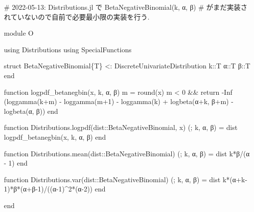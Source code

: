 \documentclass[
  letterpaper,
  DIV=11,
  numbers=noendperiod]{scrartcl}
\newenvironment{Shaded}{\begin{snugshade}}{\end{snugshade}}
\newcommand{\BuiltInTok}[1]{\textcolor[rgb]{0.00,0.23,0.31}{#1}}
\newcommand{\CommentTok}[1]{\textcolor[rgb]{0.37,0.37,0.37}{#1}}
\newcommand{\ConstantTok}[1]{\textcolor[rgb]{0.56,0.35,0.01}{#1}}
\newcommand{\ControlFlowTok}[1]{\textcolor[rgb]{0.00,0.23,0.31}{#1}}
\newcommand{\DataTypeTok}[1]{\textcolor[rgb]{0.68,0.00,0.00}{#1}}
\newcommand{\FloatTok}[1]{\textcolor[rgb]{0.68,0.00,0.00}{#1}}
\newcommand{\FunctionTok}[1]{\textcolor[rgb]{0.28,0.35,0.67}{#1}}
\newcommand{\ImportTok}[1]{\textcolor[rgb]{0.00,0.46,0.62}{#1}}
\newcommand{\KeywordTok}[1]{\textcolor[rgb]{0.00,0.23,0.31}{#1}}
\newcommand{\NormalTok}[1]{\textcolor[rgb]{0.00,0.23,0.31}{#1}}
\newcommand{\OperatorTok}[1]{\textcolor[rgb]{0.37,0.37,0.37}{#1}}
\begin{document}
\begin{Shaded}
\begin{Highlighting}[]
\CommentTok{\# 2022{-}05{-}13: Distributions.jl で BetaNegativeBinomial(k, α, β)}
\CommentTok{\# がまだ実装されていないので自前で必要最小限の実装を行う.}

\KeywordTok{module}\NormalTok{ O}

\ImportTok{using} \BuiltInTok{Distributions}
\ImportTok{using} \BuiltInTok{SpecialFunctions}

\KeywordTok{struct}\NormalTok{ BetaNegativeBinomial\{T\} }\OperatorTok{\textless{}:}\DataTypeTok{ DiscreteUnivariateDistribution}
\NormalTok{    k}\OperatorTok{::}\DataTypeTok{T}
\NormalTok{    α}\OperatorTok{::}\DataTypeTok{T}
\NormalTok{    β}\OperatorTok{::}\DataTypeTok{T}
\KeywordTok{end}

\KeywordTok{function} \FunctionTok{logpdf\_betanegbin}\NormalTok{(x, k, α, β)}
\NormalTok{    m }\OperatorTok{=} \FunctionTok{round}\NormalTok{(x)}
\NormalTok{    m }\OperatorTok{\textless{}} \FloatTok{0} \OperatorTok{\&\&} \ControlFlowTok{return} \OperatorTok{{-}}\ConstantTok{Inf}
\NormalTok{    (}\FunctionTok{loggamma}\NormalTok{(k}\OperatorTok{+}\NormalTok{m) }\OperatorTok{{-}} \FunctionTok{loggamma}\NormalTok{(m}\OperatorTok{+}\FloatTok{1}\NormalTok{) }\OperatorTok{{-}} \FunctionTok{loggamma}\NormalTok{(k) }\OperatorTok{+} \FunctionTok{logbeta}\NormalTok{(α}\OperatorTok{+}\NormalTok{k, β}\OperatorTok{+}\NormalTok{m) }\OperatorTok{{-}} \FunctionTok{logbeta}\NormalTok{(α, β))}
\KeywordTok{end}

\KeywordTok{function}\NormalTok{ Distributions.}\FunctionTok{logpdf}\NormalTok{(dist}\OperatorTok{::}\DataTypeTok{BetaNegativeBinomial}\NormalTok{, x)}
\NormalTok{    (; k, α, β) }\OperatorTok{=}\NormalTok{ dist}
    \FunctionTok{logpdf\_betanegbin}\NormalTok{(x, k, α, β)}
\KeywordTok{end}

\KeywordTok{function}\NormalTok{ Distributions.}\FunctionTok{mean}\NormalTok{(dist}\OperatorTok{::}\DataTypeTok{BetaNegativeBinomial}\NormalTok{)}
\NormalTok{    (; k, α, β) }\OperatorTok{=}\NormalTok{ dist}
\NormalTok{    k}\OperatorTok{*}\NormalTok{β}\OperatorTok{/}\NormalTok{(α }\OperatorTok{{-}} \FloatTok{1}\NormalTok{)}
\KeywordTok{end}

\KeywordTok{function}\NormalTok{ Distributions.}\FunctionTok{var}\NormalTok{(dist}\OperatorTok{::}\DataTypeTok{BetaNegativeBinomial}\NormalTok{)}
\NormalTok{    (; k, α, β) }\OperatorTok{=}\NormalTok{ dist}
    \FunctionTok{k*}\NormalTok{(α}\OperatorTok{+}\NormalTok{k}\OperatorTok{{-}}\FloatTok{1}\NormalTok{)}\FunctionTok{*β*}\NormalTok{(α}\OperatorTok{+}\NormalTok{β}\OperatorTok{{-}}\FloatTok{1}\NormalTok{)}\OperatorTok{/}\NormalTok{((α}\OperatorTok{{-}}\FloatTok{1}\NormalTok{)}\OperatorTok{\^{}}\FloatTok{2}\FunctionTok{*}\NormalTok{(α}\OperatorTok{{-}}\FloatTok{2}\NormalTok{))}
\KeywordTok{end}

\KeywordTok{end}
\end{Highlighting}
\end{Shaded}
\end{document}
